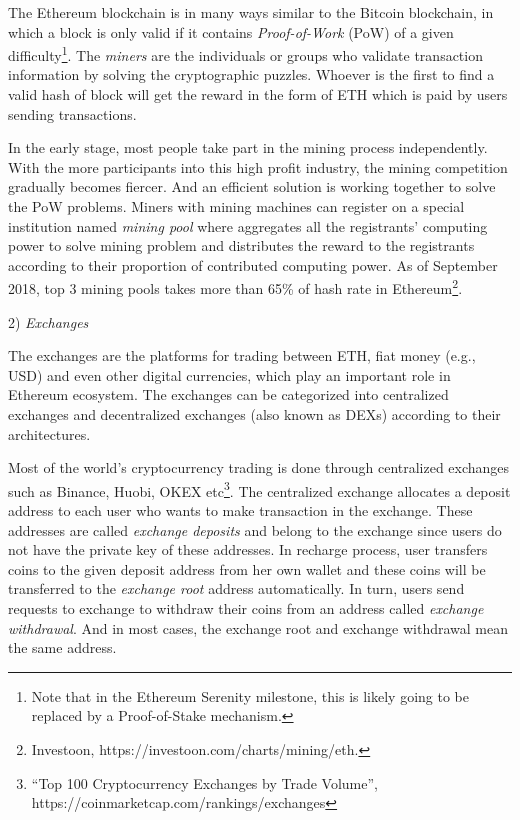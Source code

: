 The Ethereum blockchain is in many ways similar to the Bitcoin blockchain, in which a block is only valid if it contains \emph{Proof-of-Work} (PoW) of a given difficulty\footnote{Note that in the Ethereum Serenity milestone, this is likely going to be replaced by a Proof-of-Stake mechanism.}. The \emph{miners} are the individuals or groups who validate transaction information by solving the cryptographic puzzles. Whoever is the first to find a valid hash of block will get the reward in the form of ETH which is paid by users sending transactions.

In the early stage, most people take part in the mining process independently. With the more participants into this high profit industry, the mining competition gradually becomes fiercer. And an efficient solution is working together to solve the PoW problems. Miners with mining machines can register on a special institution named \emph{mining pool} where aggregates all the registrants' computing power to solve mining problem and distributes the reward to the registrants according to their proportion of contributed computing power. As of September 2018, top $3$ mining pools takes more than 65\% of hash rate in Ethereum\footnote{Investoon, https://investoon.com/charts/mining/eth.}.


2) \emph{Exchanges}

The exchanges are the platforms for trading between ETH, fiat money (e.g., USD) and even other digital currencies, which play an important role in Ethereum ecosystem. The exchanges can be categorized into centralized exchanges and decentralized exchanges (also known as DEXs) according to their architectures.

Most of the world’s cryptocurrency trading is done through centralized exchanges such as Binance, Huobi, OKEX etc\footnote{``Top 100 Cryptocurrency Exchanges by Trade Volume'', https://coinmarketcap.com/rankings/exchanges}. The centralized exchange allocates a deposit address to each user who wants to make transaction in the exchange. These addresses are called \emph{exchange deposits} and belong to the exchange since users do not have the private key of these addresses. In recharge process, user transfers coins to the given deposit address from her own wallet and these coins will be transferred to the \emph{exchange root} address automatically. In turn, users send requests to exchange to withdraw their coins from an address called \emph{exchange withdrawal}. And in most cases, the exchange root and exchange withdrawal mean the same address.

